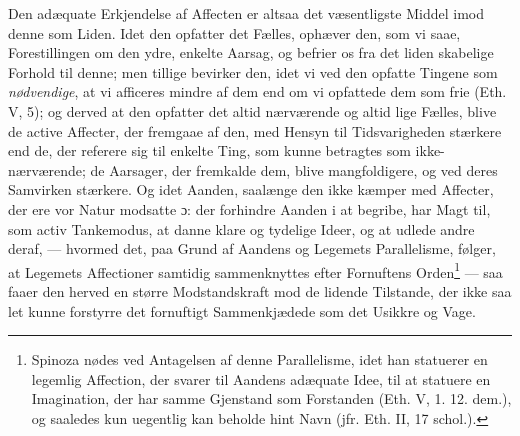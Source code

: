 \documentclass[12pt,a4paper]{book}
\newcommand{\opage}[1]{\marginnote{\footnotesize\textit{[#1]}}}
\begin{document}
Den adæquate Erkjendelse af Affecten er altsaa det
væsentligste Middel imod denne som Liden. Idet den opfatter
det Fælles, ophæver den, som vi saae, Forestillingen
om den ydre, enkelte Aarsag, og befrier os fra det liden\-%
\opage{164}\setcounter{footnote}{0}%
skabelige Forhold til denne; men tillige bevirker den, idet
vi ved den opfatte Tingene som \emph{nødvendige}, at vi afficeres
mindre af dem end om vi opfattede dem som frie
(Eth. V, 5); og derved at den opfatter det altid nærværende
og altid lige Fælles, blive de active Affecter, der fremgaae
af den, med Hensyn til Tidsvarigheden stærkere end de,
der referere sig til enkelte Ting, som kunne betragtes som
ikke-nærværende; de Aarsager, der fremkalde dem, blive
mangfoldigere, og ved deres Samvirken stærkere. Og idet
Aanden, saalænge den ikke kæmper med Affecter, der ere
vor Natur modsatte ɔ: der forhindre Aanden i at begribe,
har Magt til, som activ Tankemodus, at danne klare og
tydelige Ideer, og at udlede andre deraf, --- hvormed det,
paa Grund af Aandens og Legemets Parallelisme, følger, at
Legemets Affectioner samtidig sammenknyttes efter Fornuftens
Orden\footnote{Spinoza nødes ved Antagelsen af denne Parallelisme, idet han statuerer
en legemlig Affection, der svarer til Aandens adæquate Idee,
til at statuere en Imagination, der har samme Gjenstand som Forstanden
(Eth. V, 1. 12. dem.), og saaledes kun uegentlig kan beholde
hint Navn (jfr. Eth. II, 17 schol.).} --- saa faaer den herved en større Modstandskraft
mod de lidende Tilstande, der ikke saa let kunne
forstyrre det fornuftigt Sammenkjædede som det Usikkre
og Vage.
\end{document}
